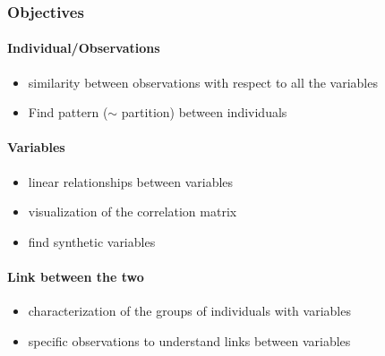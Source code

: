 \documentclass{beamer}\usepackage[]{graphicx}\usepackage[]{color}
\begin{document}
\begin{frame}
  \frametitle{Objectives}
  
\paragraph{Individual/Observations}
  
  \begin{itemize}
    \item similarity between observations with respect to all the variables 
    \item Find pattern ($\sim$ partition) between individuals
  \end{itemize}

\vfill

\paragraph{Variables} 
  
  \begin{itemize}
  \item linear relationships between variables 
  \item visualization of the correlation matrix
  \item find synthetic variables
  \end{itemize}

\vfill

\paragraph{Link between the two}
  
  \begin{itemize}
    \item characterization of the groups of individuals with variables
    \item specific observations to understand links between variables
  \end{itemize}

\end{frame}




\end{document}
